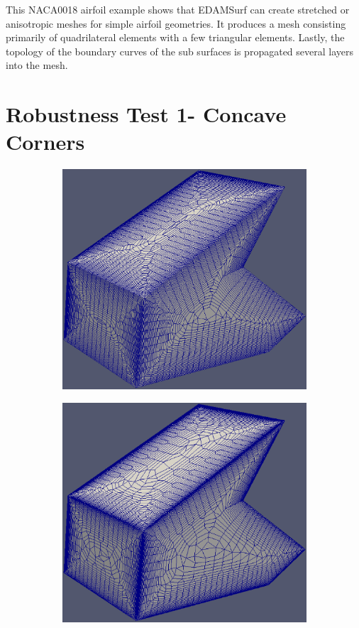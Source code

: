 This NACA0018 airfoil example shows that EDAMSurf can create stretched or anisotropic meshes for simple airfoil geometries. It produces a mesh consisting primarily of quadrilateral elements with a few triangular elements. Lastly, the topology of the boundary curves of the sub surfaces is propagated several layers into the mesh.

\section{Robustness Test 1- Concave Corners}

\begin{figure}
	\centering
	\begin{subfigure}{0.4\textwidth}
		\centering
		\includegraphics[width = 0.9\linewidth]{img/r/variousAngle-x0.5-g1.04/variousAngle.eps}
		\caption{}
		\label{fig-variousAngle-low}
	\end{subfigure}%
	\begin{subfigure}{0.4\textwidth}
		\centering
		\includegraphics[width=0.9\linewidth]{img/r/variousAngle-x0.3-g1.08/variousAngle.eps}

\end{subfigure}
\end{figure}
